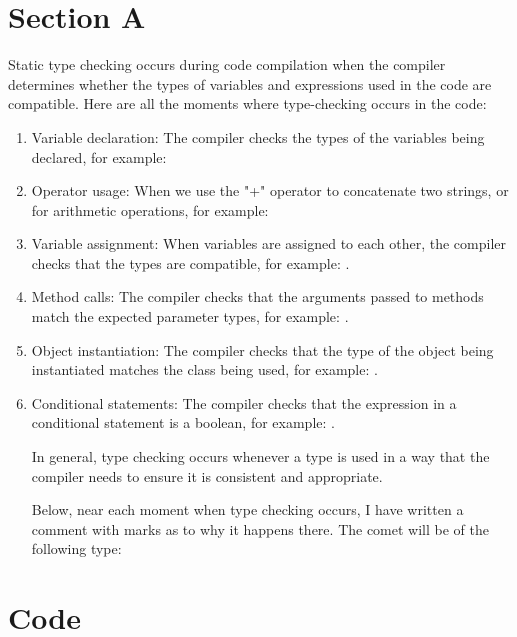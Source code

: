\documentclass{assignment}
\begin{document}

\section*{Section A}
Static type checking occurs during code compilation when the compiler determines whether the types of variables and expressions used in the code are compatible. 
Here are all the moments where type-checking occurs in the code:
\begin{enumerate}
    \item Variable declaration: The compiler checks the types of the variables being declared, for example:

    \item Operator usage: When we use the "+" operator to concatenate two strings, or for arithmetic operations, for example: 

    \item Variable assignment: When variables are assigned to each other, the compiler checks that the types are compatible, for example: .

    \item Method calls: The compiler checks that the arguments passed to methods match the expected parameter types, for example: .

    \item Object instantiation: The compiler checks that the type of the object being instantiated matches the class being used, for example: .

    \item Conditional statements: The compiler checks that the expression in a conditional statement is a boolean, for example: .

In general, type checking occurs whenever a type is used in a way that the compiler needs to ensure it is consistent and appropriate.

Below, near each moment when type checking occurs, I have written a comment with marks as to why it happens there. The comet will be of the following type: 
\end{enumerate}



\section*{Code}

\end{document}
